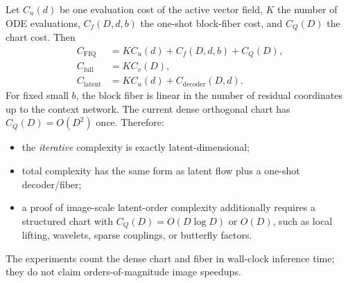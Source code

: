Let $C_u(d)$ be one evaluation cost of the active vector field, $K$ the number of ODE evaluations, $C_f(D,d,b)$ the one-shot block-fiber cost, and $C_Q(D)$ the chart cost.  Then
\begin{align}
 C_{\mathrm{FIQ}}&=K C_u(d)+C_f(D,d,b)+C_Q(D),\label{eq:cfiq}\\
 C_{\mathrm{full}}&=K C_v(D),\label{eq:cfull}\\
 C_{\mathrm{latent}}&=K C_u(d)+C_{\mathrm{decoder}}(D,d).\label{eq:clatent}
\end{align}
For fixed small $b$, the block fiber is linear in the number of residual coordinates up to the context network.  The current dense orthogonal chart has $C_Q(D)=O(D^2)$ once.  Therefore:
\begin{itemize}[leftmargin=*]
\item the \emph{iterative} complexity is exactly latent-dimensional;
\item total complexity has the same form as latent flow plus a one-shot decoder/fiber;
\item a proof of image-scale latent-order complexity additionally requires a structured chart with $C_Q(D)=O(D\log D)$ or $O(D)$, such as local lifting, wavelets, sparse couplings, or butterfly factors.
\end{itemize}
The experiments count the dense chart and fiber in wall-clock inference time; they do not claim orders-of-magnitude image speedups.
